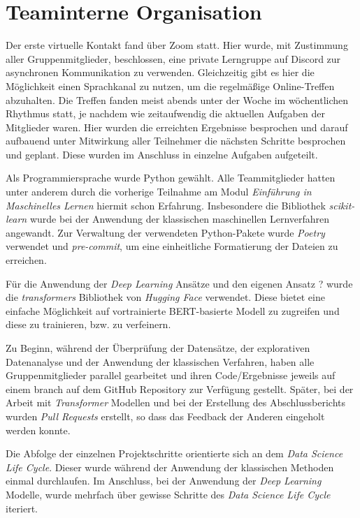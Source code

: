 \section{Teaminterne Organisation}

Der erste virtuelle Kontakt fand über Zoom statt. Hier wurde, mit Zustimmung aller Gruppenmitglieder, beschlossen, eine private Lerngruppe auf Discord zur asynchronen Kommunikation zu verwenden. Gleichzeitig gibt es hier die Möglichkeit einen Sprachkanal zu nutzen, um die regelmäßige Online-Treffen abzuhalten. Die Treffen fanden meist abends unter der Woche im wöchentlichen Rhythmus statt, je nachdem wie zeitaufwendig die aktuellen Aufgaben der Mitglieder waren. Hier wurden die erreichten Ergebnisse besprochen und darauf aufbauend unter Mitwirkung aller Teilnehmer die nächsten Schritte besprochen und geplant. Diese wurden im Anschluss in einzelne Aufgaben aufgeteilt.

Als Programmiersprache wurde Python gewählt. Alle Teammitglieder hatten unter anderem durch die vorherige Teilnahme am Modul \textit{Einführung in Maschinelles Lernen} hiermit schon Erfahrung. Insbesondere die Bibliothek \textit{scikit-learn} wurde bei der Anwendung der klassischen maschinellen Lernverfahren angewandt.
Zur Verwaltung der verwendeten Python-Pakete wurde \textit{Poetry} verwendet und \textit{pre-commit}, um eine einheitliche Formatierung der Dateien zu erreichen.

Für die Anwendung der \textit{Deep Learning} Ansätze und den eigenen Ansatz ? wurde die \textit{transformers} Bibliothek von \textit{Hugging Face} verwendet. Diese bietet eine einfache Möglichkeit auf vortrainierte BERT-basierte Modell zu zugreifen und diese zu trainieren, bzw. zu verfeinern.

Zu Beginn, während der Überprüfung der Datensätze, der explorativen Datenanalyse und der Anwendung der klassischen Verfahren, haben alle Gruppenmitglieder parallel gearbeitet und ihren Code/Ergebnisse jeweils auf einem branch auf dem GitHub Repository zur Verfügung gestellt. Später, bei der Arbeit mit \textit{Transformer} Modellen und bei der Erstellung des Abschlussberichts wurden \textit{Pull Requests} erstellt, so dass das Feedback der Anderen eingeholt werden konnte. 

Die Abfolge der einzelnen Projektschritte orientierte sich an dem \textit{Data Science Life Cycle}. Dieser wurde während der Anwendung der klassischen Methoden einmal durchlaufen. Im Anschluss, bei der Anwendung der \textit{Deep Learning} Modelle, wurde mehrfach über gewisse Schritte des \textit{Data Science Life Cycle} iteriert. 

